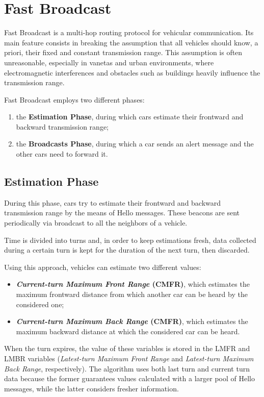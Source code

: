 
\chapter{Fast Broadcast}
	Fast Broadcast \cite{4199282} is a multi-hop routing protocol for vehicular communication. Its main feature consists in breaking the assumption that all vehicles should know, a priori, their fixed and constant transmission range. This assumption is often unreasonable, especially in \acrshort{vaneta}s and urban environments, where electromagnetic interferences and obstacles such as buildings heavily influence the transmission range.
	
	
	Fast Broadcast employs two different phases:
	\begin{enumerate}
		\item the \textbf{Estimation Phase}, during which cars estimate their frontward and backward transmission range;
		\item the \textbf{Broadcasts Phase}, during which a car sends an alert message and the other cars need to forward it.
	\end{enumerate}

	\section{Estimation Phase}
		During this phase, cars try to estimate their frontward and backward transmission range by the means of Hello messages. These beacons are sent periodically via broadcast to all the neighbors of a vehicle.
		
		
		Time is divided into turns and, in order to keep estimations fresh, data collected during a certain turn is kept for the duration of the next turn, then discarded.
		
		
		Using this approach, vehicles can estimate two different values:
		\begin{itemize}
			\item \textbf{\textit{Current-turn Maximum Front Range} (CMFR)}, which estimates the maximum frontward distance from which another car can be heard by the considered one;
			\item \textbf{\textit{Current-turn Maximum Back Range} (CMFR)}, which estimates the maximum backward distance at which the considered car can be heard.
		\end{itemize}
		When the turn expires, the value of these variables is stored in the LMFR and LMBR variables (\textit{Latest-turn Maximum Front Range} and \textit{Latest-turn Maximum Back Range}, respectively). The algorithm uses both last turn and current turn data because the former guarantees values calculated with a larger pool of Hello messages, while the latter considers fresher information.
		
